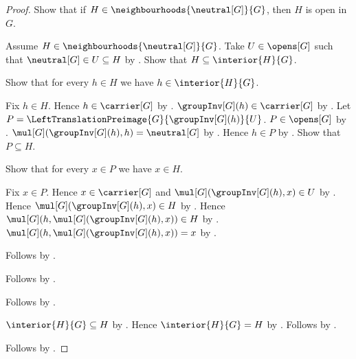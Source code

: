 \begin{proof}
    Show that if $H\in\neighbourhoods{\neutral[G]}{G}$, then
        $H$ is open in $G$.
    \begin{subproof}
        Assume $H\in\neighbourhoods{\neutral[G]}{G}$.
        Take $U\in\opens[G]$ such that
            $\neutral[G]\in U\subseteq H$ by .
        Show that $H\subseteq\interior{H}{G}$.
        \begin{subproof}
            Show that for every $h\in H$ we have
                $h\in\interior{H}{G}$.
            \begin{subproof}
                Fix $h\in H$.
                Hence $h\in\carrier[G]$ by .
                $\groupInv[G](h)\in\carrier[G]$
                    by .
                Let $P=\LeftTranslationPreimage{G}{\groupInv[G](h)}{U}$.
                $P\in\opens[G]$ by .
                $\mul[G](\groupInv[G](h),h)=\neutral[G]$
                    by .
                Hence $h\in P$ by .
                Show that $P\subseteq H$.
                \begin{subproof}
                    Show that for every $x\in P$ we have $x\in H$.
                    \begin{subproof}
                        Fix $x\in P$.
                        Hence $x\in\carrier[G]$ and
                            $\mul[G](\groupInv[G](h),x)\in U$
                            by .
                        Hence $\mul[G](\groupInv[G](h),x)\in H$
                            by .
                        Hence
                            $\mul[G](h,\mul[G](\groupInv[G](h),x))\in H$
                            by .
                        $\mul[G](h,\mul[G](\groupInv[G](h),x))=x$ by
                            .
                    \end{subproof}
                    Follows by .
                \end{subproof}
                Follows by .
            \end{subproof}
            Follows by .
        \end{subproof}
        $\interior{H}{G}\subseteq H$ by .
        Hence $\interior{H}{G}=H$ by .
        Follows by .
    \end{subproof}
    Follows by \auto.
\end{proof}
